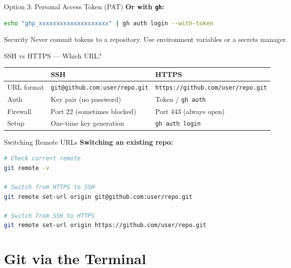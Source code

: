 \documentclass[aspectratio=169, 11pt]{beamer}
\begin{document}
\begin{frame}[fragile]{Option 3: Personal Access Token (PAT)}
  \textbf{Or with \texttt{gh}:}
  \begin{lstlisting}[language=bash]
echo "ghp_xxxxxxxxxxxxxxxxxxxx" | gh auth login --with-token
  \end{lstlisting}

  \begin{alertblock}{Security}
    Never commit tokens to a repository. Use environment variables or a secrets manager.
  \end{alertblock}
\end{frame}

\begin{frame}[fragile]{SSH vs HTTPS --- Which URL?}
  \begin{table}
    \centering
    \begin{tabular}{@{} l l l @{}}
      \toprule
      & \textbf{SSH} & \textbf{HTTPS} \\
      \midrule
      URL format & \texttt{git@github.com:user/repo.git} & \texttt{https://github.com/user/repo.git} \\
      Auth       & Key pair (no password)       & Token / \texttt{gh auth} \\
      Firewall   & Port 22 (sometimes blocked)  & Port 443 (always open) \\
      Setup      & One-time key generation       & \texttt{gh auth login} \\
      \bottomrule
    \end{tabular}
  \end{table}
\end{frame}

\begin{frame}[fragile]{Switching Remote URLs}
  \vspace{0.5em}
  \textbf{Switching an existing repo:}
  \begin{lstlisting}[language=bash]
# Check current remote
git remote -v

# Switch from HTTPS to SSH
git remote set-url origin git@github.com:user/repo.git

# Switch from SSH to HTTPS
git remote set-url origin https://github.com/user/repo.git
  \end{lstlisting}
\end{frame}

\section{Git via the Terminal}
\end{document}
